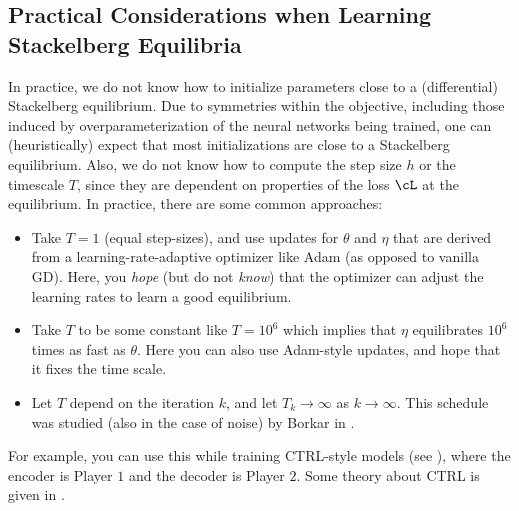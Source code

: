 \documentclass[../../book-main.tex]{subfiles}
\begin{document}
\subsection{Practical Considerations when Learning Stackelberg Equilibria}

In practice, we do not know how to initialize parameters close to a (differential) Stackelberg equilibrium. Due to symmetries within the objective, including those induced by overparameterization of the neural networks being trained, one can (heuristically) expect that most initializations are close to a Stackelberg equilibrium. Also, we do not know how to compute the step size \(h\) or the timescale \(T\), since they are dependent on properties of the loss \(\cL\) at the equilibrium. In practice, there are some common approaches:
\begin{itemize}
    \item Take \(T = 1\) (equal step-sizes), and use updates for \(\theta\) and \(\eta\) that are derived from a learning-rate-adaptive optimizer like Adam (as opposed to vanilla GD). Here, you \textit{hope} (but do not \textit{know}) that the optimizer can adjust the learning rates to learn a good equilibrium.
    \item Take \(T\) to be some constant like \(T = 10^{6}\) which implies that \(\eta\) equilibrates \(10^{6}\) times as fast as \(\theta\). Here you can also use Adam-style updates, and hope that it fixes the time scale.
    \item Let \(T\) depend on the iteration \(k\), and let \(T_{k} \to \infty\) as \(k \to \infty\). This schedule was studied (also in the case of noise) by Borkar in \cite{borkar1997stochastic}.
\end{itemize}
For example, you can use this while training CTRL-style models (see ), where the encoder is Player \(1\) and the decoder is Player \(2\). Some theory about CTRL is given in .


\end{document}

